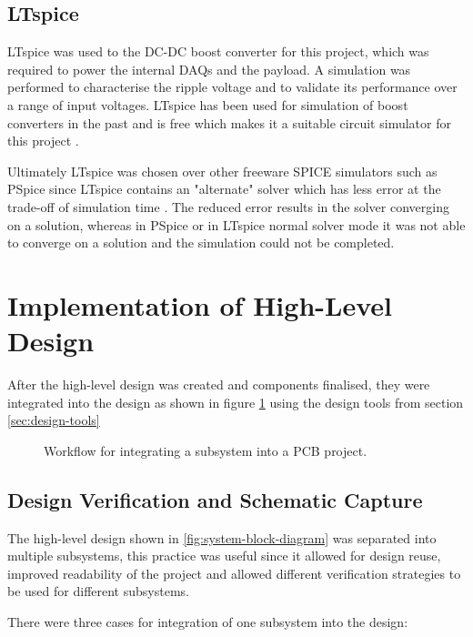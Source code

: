 \documentclass{report}
\newcommand*{\secref}[1]{section \hyperref[{#1}]{\ref*{#1} \nameref*{#1}}}
\begin{document}
\subsection{LTspice}

LTspice was used to the DC-DC boost converter for this project, which was required to power the internal DAQs and the payload. A simulation was performed to characterise the ripple voltage and to validate its performance over a range of input voltages. LTspice has been used for simulation of boost converters in the past and is free which makes it a suitable circuit simulator for this project \cite{giesselmann2019modeling}.

Ultimately LTspice was chosen over other freeware SPICE simulators such as PSpice since LTspice contains an "alternate" solver which has less error at the trade-off of simulation time \cite{ltspice2022}. The reduced error results in the solver converging on a solution, whereas in PSpice or in LTspice normal solver mode it was not able to converge on a solution and the simulation could not be completed.

\section{Implementation of High-Level Design}

After the high-level design was created and components finalised, they were integrated into the design as shown in figure \ref{fig:implementation-workflow} using the design tools from \secref{sec:design-tools}

\begin{figure}[H]
  \centering
  
  \caption{Workflow for integrating a subsystem into a PCB project.}
  \label{fig:implementation-workflow}
\end{figure}

\subsection{Design Verification and Schematic Capture}

The high-level design shown in \ref{fig:system-block-diagram} was separated into multiple subsystems, this practice was useful since it allowed for design reuse, improved readability of the project and allowed different verification strategies to be used for different subsystems.

There were three cases for integration of one subsystem into the design:
\end{document}
